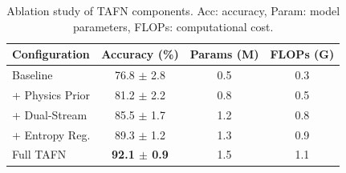 \begin{table}[t]
\centering
\caption{Ablation study of TAFN components. Acc: accuracy, Param: model parameters, FLOPs: computational cost.}
\label{tab:ablation}
\footnotesize
\begin{tabular}{lccc}
\toprule
Configuration & Accuracy (\%) & Params (M) & FLOPs (G) \\
\midrule
Baseline & 76.8 $\pm$ 2.8 & 0.5 & 0.3 \\
+ Physics Prior & 81.2 $\pm$ 2.2 & 0.8 & 0.5 \\
+ Dual-Stream & 85.5 $\pm$ 1.7 & 1.2 & 0.8 \\
+ Entropy Reg. & 89.3 $\pm$ 1.2 & 1.3 & 0.9 \\
Full TAFN & \textbf{92.1 $\pm$ 0.9} & 1.5 & 1.1 \\
\bottomrule
\end{tabular}
\end{table}

